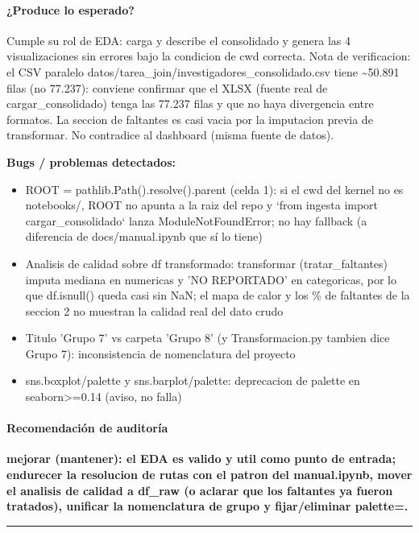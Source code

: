 \paragraph{¿Produce lo esperado?}
Cumple su rol de EDA: carga y describe el consolidado y genera las 4 visualizaciones sin errores bajo la condicion de cwd correcta. Nota de verificacion: el CSV paralelo datos/tarea\_join/investigadores\_consolidado.csv tiene \textasciitilde{}50.891 filas (no 77.237): conviene confirmar que el XLSX (fuente real de cargar\_consolidado) tenga las 77.237 filas y que no haya divergencia entre formatos. La seccion de faltantes es casi vacia por la imputacion previa de transformar. No contradice al dashboard (misma fuente de datos).

\begin{tcolorbox}[riesgo]
\textbf{Bugs / problemas detectados:}
\begin{itemize}
  \item ROOT = pathlib.Path().resolve().parent (celda 1): si el cwd del kernel no es notebooks/, ROOT no apunta a la raiz del repo y `from ingesta import cargar\_consolidado` lanza ModuleNotFoundError; no hay fallback (a diferencia de docs/manual.ipynb que sí lo tiene)
  \item Analisis de calidad sobre df transformado: transformar (tratar\_faltantes) imputa mediana en numericas y 'NO REPORTADO' en categoricas, por lo que df.isnull() queda casi sin NaN; el mapa de calor y los \% de faltantes de la seccion 2 no muestran la calidad real del dato crudo
  \item Titulo 'Grupo 7' vs carpeta 'Grupo 8' (y Transformacion.py tambien dice Grupo 7): inconsistencia de nomenclatura del proyecto
  \item sns.boxplot/palette y sns.barplot/palette: deprecacion de palette en seaborn>=0.14 (aviso, no falla)
\end{itemize}
\end{tcolorbox}

\paragraph{Recomendación de auditoría}
\textbf{mejorar (mantener): el EDA es valido y util como punto de entrada; endurecer la resolucion de rutas con el patron del manual.ipynb, mover el analisis de calidad a df\_raw (o aclarar que los faltantes ya fueron tratados), unificar la nomenclatura de grupo y fijar/eliminar palette=.}

\medskip
\hrule

